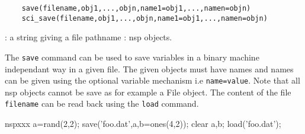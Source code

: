 \begin{mandesc}
\end{mandesc}

\begin{calling_sequence}
  \begin{verbatim}
    save(filename,obj1,...,objn,name1=obj1,...,namen=objn)  
    sci_save(filename,obj1,...,objn,name1=obj1,...,namen=objn)  
  \end{verbatim}
\end{calling_sequence}
\begin{parameters}
  \begin{varlist}
    : a string giving a file pathname 
    : nsp objects. 
  \end{varlist}
\end{parameters}
\begin{mandescription}
  The \verb!save! command can be used to save variables in a binary machine independant way 
  in a given file. The given objects must have names and names can be given using the optional 
  variable mechanism i.e \verb+name=value+. Note that all nsp objects cannot be save as for example 
  a File object. The content of the file \verb+filename+ can be read back using the \verb+load+ command.
\end{mandescription}
\begin{examples}
  \begin{mintednsp}{nspxxx}
a=rand(2,2);
    save('foo.dat',a,b=ones(4,2));
    clear a,b;
    load('foo.dat');
  \end{mintednsp}
\end{examples}
\begin{manseealso}
\end{manseealso}

